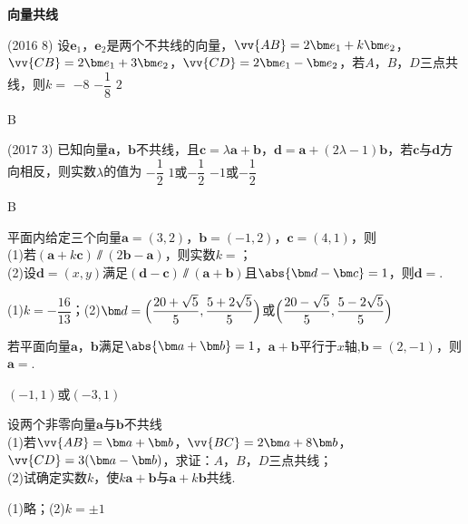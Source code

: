   \begin{exercise}{\textbf{向量共线}}
    \item%
      (2016  8)
      设$\bm e_1$，$\bm e_2$是两个不共线的向量，$\vv{AB}=2\bm e_1+k\bm e_2$，$\vv{CB}=2\bm e_1+3\bm e_2$，$\vv{CD}=2\bm e_1-\bm e_2$，若$A$，$B$，$D$三点共线，则$k=$\xz
        {$-8$}
        {$-\dfrac18$}
        {$2$}
      \begin{answer}
        B
      \end{answer}
    \item%
      (2017  3)
      已知向量$\bm a$，$\bm b$不共线，且$\bm c=\lambda\bm a+\bm b$，$\bm d=\bm a+(2\lambda-1)\bm b$，若$\bm c$与$\bm d$方向相反，则实数$\lambda$的值为\xz
       {$-\dfrac12$}
       {$1$或$-\dfrac12$}
       {$-1$或$-\dfrac12$}
      \begin{answer}
        B
      \end{answer}
    \item%
      平面内给定三个向量$\bm a=(3,2)$，$\bm b=(-1,2)$，$\bm c=(4,1)$，则\\
      (1)若$(\bm a+k\bm c)\varparallel(2\bm b-\bm a)$，则实数$k=$\tk；\\
      (2)设$\bm d=(x,y)$满足$(\bm d-\bm c) \varparallel (\bm a+\bm b)$且$\abs{\bm d-\bm c}=1$，则$\bm d=$\tk.
      \begin{answer}
        (1)$k=-\dfrac{16}{13}$；(2)$\bm d=\Bigl(\dfrac{20+\sqrt{5}}5,\dfrac{5+2\sqrt{5}}5\Bigr)$或$\Bigl(\dfrac{20-\sqrt{5}}5,\dfrac{5-2\sqrt{5}}5\Bigr)$
      \end{answer}
    \item%
      若平面向量$\bm a$，$\bm b$满足$\abs{\bm a+\bm b}=1$，$\bm a+\bm b$平行于$x$轴,$\bm b=(2,-1)$，则$\bm a=$\tk.
      \begin{answer}
        $(-1,1)$或$(-3,1)$
      \end{answer}
    \item%
      设两个非零向量$\bm a$与$\bm b$不共线\\
      (1)若$\vv{AB}=\bm a+\bm b$，$\vv{BC}=2\bm a+8\bm b$，$\vv{CD}=3(\bm a-\bm b)$，求证：$A$，$B$，$D$三点共线；\\
      (2)试确定实数$k$，使$k\bm a+\bm b$与$\bm a+k\bm b$共线.
      \begin{answer}
        (1)略；(2)$k=\pm1$
      \end{answer}
    \vspace{5cm}
  \end{exercise}
